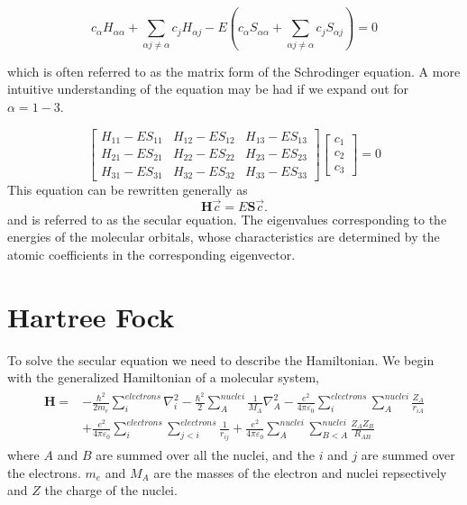 \begin{equation}
  c_{\alpha} H_{\alpha \alpha} + \sum_{\alpha j \neq \alpha} c_j H_{\alpha j} -
  E \left( c_{\alpha} S_{\alpha \alpha} + \sum_{\alpha j \neq \alpha} c_j S_{\alpha j} \right) = 0
\end{equation}

which is often referred to as the matrix form of the Schrodinger
equation.  A more intuitive understanding of the equation may be had
if we expand out for $\alpha=1-3$.

\begin{equation} \label{eq:SchrodingerMatrix}
  \begin{bmatrix}
    H_{11}-ES_{11} & H_{12}-ES_{12} & H_{13}-ES_{13} \\
    H_{21}-ES_{21} & H_{22}-ES_{22} & H_{23}-ES_{23} \\
    H_{31}-ES_{31} & H_{32}-ES_{32} & H_{33}-ES_{33}
  \end{bmatrix}
  \begin{bmatrix}
    c_1 \\
    c_2 \\
    c_3
  \end{bmatrix} = 0
\end{equation}
This equation can be rewritten generally as
\begin{equation}
  \mathbf{H}\vec{c} = E \mathbf{S} \vec{c}.
\end{equation}
and is referred to as the secular equation.
The eigenvalues corresponding to the energies of the molecular orbitals,
whose characteristics are determined by the atomic coefficients in the
corresponding eigenvector.\cite{engel2012quantum}

\section{Hartree Fock}
To solve the secular equation we need to describe the Hamiltonian.
We begin with the generalized Hamiltonian of a molecular system,\cite{engel2012quantum}
\begin{align} \label{eq:fullhamiltonian}
  \begin{split}
    \mathbf{H} =& -\frac{\hbar^2}{2m_e}\sum_i^{electrons}\nabla_i^2-\frac{\hbar^2}{2}\sum_{A}^{nuclei}\frac{1}{M_{A}}\nabla_{A}^2 - \frac{e^2}{4\pi\varepsilon_0} \sum_i^{electrons}\sum_A^{nuclei}\frac{Z_A}{r_{iA}} \\
    & + \frac{e^2}{4\pi\varepsilon_0}\sum_{i}^{electrons}\sum_{j<i}^{electrons}\frac{1}{r_{ij}} + \frac{e^2}{4\pi\varepsilon_0}\sum_{A}^{nuclei}\sum_{B<A}^{nuclei}\frac{Z_AZ_B}{R_{AB}}
  \end{split}
\end{align}
where $A$ and $B$ are summed over all the nuclei, and the $i$ and $j$ are summed over the electrons. 
\(m_e\) and \(M_A\) are the masses of the electron and nuclei repsectively and $Z$ the charge of the nuclei.

